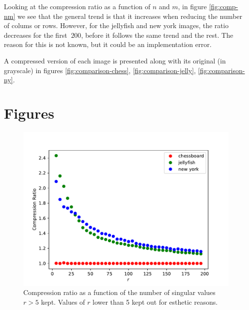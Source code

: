 \documentclass[12pt]{article}
\begin{document}
Looking at the compression ratio as a function of $n$ and $m$, in
figure \ref{fig:comp-nm} we see that the general trend is that it
increases when reducing the number of colums or rows.
However, for the jellyfish and new york images, the ratio decreases for the
first $~200$, before it follows the same trend and the rest. The reason
for this is not known, but it could be an implementation error.

A compressed version of each image is presented along with its original
(in grayscale) in figures 
\ref{fig:comparison-chess}, \ref{fig:comparison-jelly}, \ref{fig:comparison-ny}.

\section{Figures}
\begin{figure}[h]
	\includegraphics[width = \textwidth]{figures/compression_ratio_r.pdf}
	\caption{Compression ratio as a function of the number of singular
	values $r > 5$ kept. Values of $r$ lower than 5 kept out for 
	esthetic reasons.}
	\label{fig:comp-r}
\end{figure}
\end{document}

